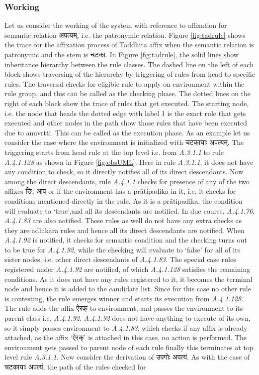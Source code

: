 \documentclass[11pt]{article}
\begin{document}
\subsubsection{Working}
\label{sect:woring}
Let us consider the working of the system with reference to affixation for semantic relation {\skt अपत्यम्}, i.e. the patronymic relation. Figure \ref{fig:tadrule} shows the trace for the affixation process of Taddhita affix when the semantic relation is patronymic and the stem is {\skt चटका}. In Figure \ref{fig:tadrule}, the solid lines show inheritance hierarchy between the rule classes. The dashed line on the left of each block shows traversing of the hierarchy by triggering of rules from head to specific rules. The traversal checks for eligible rule to apply on environment within the rule group, and this can be called as the checking phase. The dotted lines on the right of each block show the trace of rules that get executed. The starting node, i.e. the node that heads the dotted edge with label 1 is the exact rule that gets executed and other nodes in the path show those rules that have been executed due to anuvrtti. This can be called as the execution phase. As an example let us consider the case where the environment is initialized with {\skt चटकायाः अपत्यम्}. The triggering starts from head rule at the top level i.e. from  {\sl A.3.1.1} to rule  {\sl A.4.1.128} as shown in Figure \ref{fig:obsUML}. Here in rule {\sl A.3.1.1}, it does not have any condition to check, so it directly notifies all of its direct descendants. Now among the direct descendants, rule {\sl A.4.1.1} checks for presence of any of the two affixes {\skt ङि, आप्} or if the environment has a prātipadika in it, i.e. it checks for conditions mentioned directly in the rule. As it is a prātipadika, the condition will evaluate to `true',and all its descendants are notified. In due course, {\sl A.4.1.76}, {\sl A.4.1.83} are also notified. These rules as well do not have any extra checks as they are adhikāra rules and hence all its direct descendants are notified. When {\sl A.4.1.92} is notified, it checks for semantic condition and the checking turns out to be true for {\sl A.4.1.92}, while the checking will evaluate to `false' for all of its sister nodes, i.e. other direct descendants of {\sl A.4.1.83}. The special case rules registered under {\sl A.4.1.92} are notified, of which {\sl A.4.1.128} satisfies the remaining conditions. As it does not have any rules registered to it, it becomes the terminal node and hence it is added to the candidate list. Since for this case no other rule is contesting, the rule emerges winner and starts its execution from {\sl A.4.1.128.} The rule adds the affix {\skt ऐरक्} to environment, and passes the environment to its parent class i.e. {\sl A.4.1.92}. {\sl A.4.1.92} does not have anything to execute of its own, so it simply passes environment to {\sl A.4.1.83}, which checks if any affix is already attached, as the affix `{\skt ऐरक्}' is attached in this case, no action is performed. The environment gets passed to parent node of each rule finally this terminates at top level rule {\sl A.3.1.1}. Now consider the derivation of {\skt उपगोः अपत्यं}. As with the case of {\skt चटकायाः अपत्यं}, the path of the rules checked for 
\end{document}

